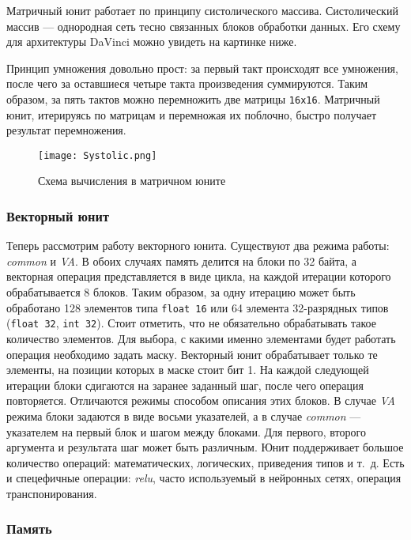 Матричный юнит работает по принципу систолического массива.
Систолический массив --- однородная сеть тесно связанных блоков обработки данных.
Его схему для архитектуры DaVinci можно увидеть на картинке ниже.

Принцип умножения довольно прост: за первый такт происходят все умножения,
после чего за оставшиеся четыре такта произведения суммируются. Таким
образом, за пять тактов можно перемножить две матрицы \texttt{16x16}.
Матричный юнит, итерируясь по матрицам и перемножая их поблочно, быстро
получает результат перемножения.

\begin{figure}[h!]
    \centering
    \texttt{[image: Systolic.png]}
    \caption{Схема вычисления в матричном юните}
\end{figure}

\subsubsection{Векторный юнит}

Теперь рассмотрим работу векторного юнита. Существуют два режима работы:
\textit{common} и \textit{VA}. В обоих случаях память делится на блоки
по 32 байта, а векторная операция представляется в виде цикла, на каждой
итерации которого обрабатывается 8 блоков. Таким образом, за одну итерацию
может быть обработано 128 элементов типа \texttt{float 16} или 64 элемента
32-разрядных типов (\texttt{float 32}, \texttt{int 32}). Стоит отметить, что
не обязательно обрабатывать такое количество элементов. Для выбора, с какими
именно элементами будет работать операция необходимо задать маску. Векторный
юнит обрабатывает только те элементы, на позиции которых в маске стоит бит 1.
На каждой следующей итерации блоки сдигаются на заранее заданный шаг,
после чего операция повторяется. Отличаются режимы способом описания этих блоков.
В случае \textit{VA} режима блоки задаются в виде восьми указателей, а в случае
\textit{common} --- указателем на первый блок и шагом между блоками. Для первого,
второго аргумента и результата шаг может быть различным. 
Юнит поддерживает большое количество операций: математических, логических,
приведения типов и т.~д. Есть и спецефичные операции: \textit{relu}, часто
используемый в нейронных сетях, операция транспонирования.

\subsubsection{Память}

